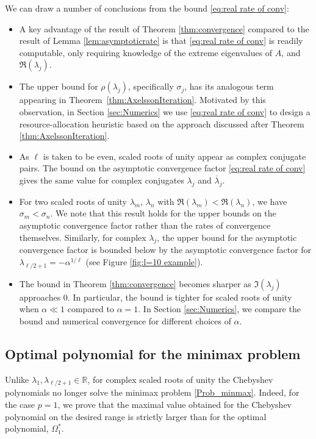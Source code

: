 \documentclass{article}
\theoremstyle{definition}
\newcommand{\poly}{\Omega}
\begin{document}
{		We can draw a number of conclusions from the bound \eqref{eq:real rate of conv}:
		\begin{itemize}
			\item A key advantage of the result of Theorem \ref{thm:convergence} compared to the result of Lemma \ref{lem:asymptoticrate} is that \eqref{eq:real rate of conv} is readily computable, only requiring knowledge of the extreme eigenvalues of $A$, and $\Re(\lambda_j)$.
			\item The upper bound for $\rho(\lambda_j)$, specifically $\sigma_j$, has its analogous term appearing in Theorem~\ref{thm:AxelssonIteration}. Motivated by this observation, in Section \ref{sec:Numerics} we use \eqref{eq:real rate of conv} to design a resource-allocation heuristic based on the approach discussed after Theorem \ref{thm:AxelssonIteration}.
			\item As $\ell$ is taken to be even, scaled roots of unity appear as complex conjugate pairs. The bound on the asymptotic convergence factor \eqref{eq:real rate of conv} gives the same value for complex conjugates $\lambda_j$ and $\overline{\lambda}_j$.
			\item For two scaled roots of unity $\lambda_m$, $\lambda_n$ with $\Re(\lambda_m) < \Re(\lambda_n)$, we have 
			{$\sigma_m  <\sigma_n$}.
			We note that this result holds for the upper bounds on the asymptotic convergence factor rather than the rates of convergence themselves. Similarly, for complex $\lambda_j$, the upper bound for the asymptotic convergence factor is bounded below by the asymptotic convergence factor for ${\lambda_{\ell/2+1}} = -{\alpha^{1/\ell}}$ (see Figure \ref{fig:l=10 example}). 
			\item  The bound in Theorem \ref{thm:convergence} becomes sharper as $\Im(\lambda_j)$ approaches $0$. In particular, the bound is tighter for scaled roots of unity when $\alpha \ll 1$ compared to $\alpha = 1$. In Section \ref{sec:Numerics}, we compare the bound and numerical convergence for different choices of $\alpha$.
		\end{itemize}
		
		
		\subsection{{Optimal polynomial for the minimax problem}}
		Unlike $\lambda_1,\lambda_{\ell/2+1}\in\mathbb{R}$, for complex scaled roots of unity the Chebyshev polynomials no longer solve the minimax problem \eqref{Prob_minmax}. 
		Indeed, for the case $p=1$, we  prove that the maximal value obtained for the Chebyshev polynomial on the desired range is strictly larger than for the optimal polynomial, $\poly^*_1$.
		
}
\end{document}
